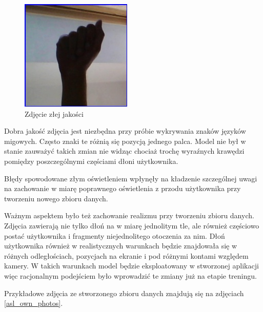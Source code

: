 \documentclass[a4paper,12pt,oneside]{book} %
\begin{document}
\begin{figure}[h]
	\centering
	\includegraphics[scale=0.6]{asl_bad_photo.jpg}
	\caption{Zdjęcie złej jakości}
	\label{asl_bad_photo}
\end{figure}

Dobra jakość zdjęcia jest niezbędna przy próbie wykrywania znaków języków migowych. Często znaki te różnią się pozycją jednego palca. Model nie był w stanie zauważyć takich zmian nie widząc chociaż trochę wyraźnych krawędzi pomiędzy poszczególnymi częściami dłoni użytkownika.

Błędy spowodowane złym oświetleniem wpłynęły na kładzenie szczególnej uwagi na zachowanie w miarę poprawnego oświetlenia z przodu użytkownika przy tworzeniu nowego zbioru danych.

Ważnym aspektem było też zachowanie realizmu przy tworzeniu zbioru danych. Zdjęcia zawierają nie tylko dłoń na w miarę jednolitym tle, ale również częściowo postać użytkownika i fragmenty niejednolitego otoczenia za nim. Dłoń użytkownika również w realistycznych warunkach będzie znajdowała się w różnych odległościach, pozycjach na ekranie i pod różnymi kontami względem kamery. W takich warunkach model będzie eksploatowany w stworzonej aplikacji więc racjonalnym podejściem było wprowadzić te zmiany już na etapie treningu. 

Przykładowe zdjęcia ze stworzonego zbioru danych znajdują się na zdjęciach \ref{asl_own_photos}.
\end{document}
